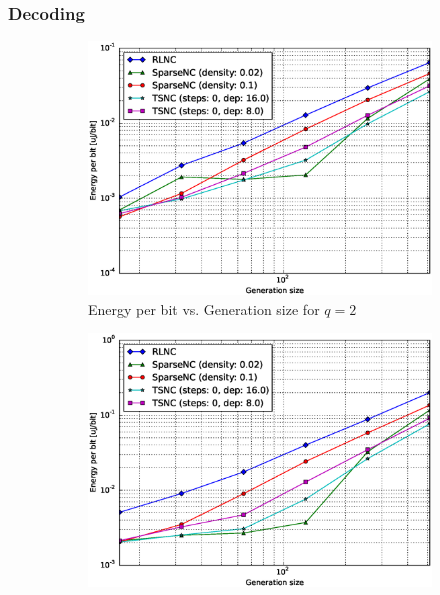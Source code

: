 \subsubsection{Decoding}

\begin{figure}
    \centering
    \begin{subfigure}[b]{0.475\textwidth}
        \centering
        \includegraphics[width=1.1\textwidth]{images/23_07_2015/energy_per_bit_vs_generation_size_Rasp_Binary_decoder_1600.eps}
        \caption[]%
        {{\small Energy per bit vs. Generation size for $q = 2$}}
        \label{fig:dec_ene_rasp1_gen_gf2}
    \end{subfigure}
    \hfill
    \begin{subfigure}[b]{0.475\textwidth}
        \centering
        \includegraphics[width=1.1\textwidth]{images/23_07_2015/energy_per_bit_vs_generation_size_Rasp_Binary8_decoder_1600.eps}

\end{subfigure}
\end{figure}
